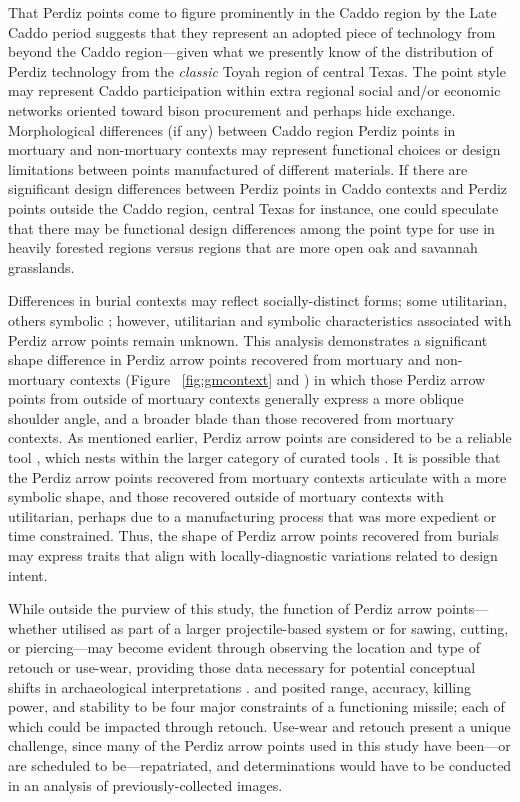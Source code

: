 \documentclass[review]{elsarticle}
\begin{document}
That Perdiz points come to figure prominently in the Caddo region by the Late Caddo period suggests that they represent an adopted piece of technology from beyond the Caddo region—given what we presently know of the distribution of Perdiz technology from the \textit{classic} Toyah region of central Texas. The point style may represent Caddo participation within extra regional social and/or economic networks oriented toward bison procurement and perhaps hide exchange. Morphological differences (if any) between Caddo region Perdiz points in mortuary and non-mortuary contexts may represent functional choices or design limitations between points manufactured of different materials. If there are significant design differences between Perdiz points in Caddo contexts and Perdiz points outside the Caddo region, central Texas for instance, one could speculate that there may be functional design differences among the point type for use in heavily forested regions versus regions that are more open oak and savannah grasslands. 

Differences in burial contexts may reflect socially-distinct forms; some utilitarian, others symbolic \citep[69]{RN8989}; however, utilitarian and symbolic characteristics associated with Perdiz arrow points remain unknown. This analysis demonstrates a significant shape difference in Perdiz arrow points recovered from mortuary and non-mortuary contexts (Figure ~\ref{fig:gmcontext} and \citealt{RN8980}) in which those Perdiz arrow points from outside of mortuary contexts generally express a more oblique shoulder angle, and a broader blade than those recovered from mortuary contexts. As mentioned earlier, Perdiz arrow points are considered to be a reliable tool \citep{RN5873}, which nests within the larger category of curated tools \citep{RN5880}. It is possible that the Perdiz arrow points recovered from mortuary contexts articulate with a more symbolic shape, and those recovered outside of mortuary contexts with utilitarian, perhaps due to a manufacturing process that was more expedient or time constrained. Thus, the shape of Perdiz arrow points recovered from burials may express traits that align with locally-diagnostic variations related to design intent.

While outside the purview of this study, the function of Perdiz arrow points---whether utilised as part of a larger projectile-based system or for sawing, cutting, or piercing---may become evident through observing the location and type of retouch or use-wear, providing those data necessary for potential conceptual shifts in archaeological interpretations \citep{RN8990,RN8991,RN8992,RN6342}. \citet{RN8994} and \citet{RN8993} posited range, accuracy, killing power, and stability to be four major constraints of a functioning missile; each of which could be impacted through retouch. Use-wear and retouch present a unique challenge, since many of the Perdiz arrow points used in this study have been---or are scheduled to be---repatriated, and determinations would have to be conducted in an analysis of previously-collected images.
\end{document}
